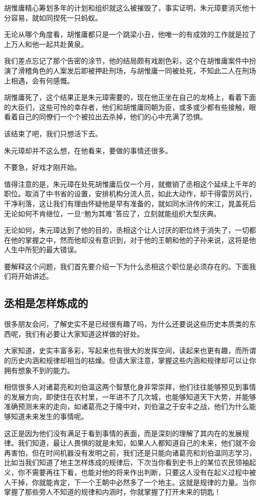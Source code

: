 \begin{multicols}{\theparacolNo}
		胡惟庸精心筹划多年的计划和组织就这么被摧毁了，事实证明，朱元璋要消灭他十分容易，就如同捏死一只蚂蚁。

		无论从哪个角度看，胡惟庸都只是一个跳梁小丑，他唯一的有成效的工作就是拉了上万人和他一起共赴黄泉。

		我们差点忘记了那个告密的涂节，他的结局颇有戏剧色彩，这个在胡惟庸案件中扮演了滑稽角色的人案发后即被押赴刑场，与胡惟庸一同被处死，不知此二人在刑场上相遇，会有何感慨。

		胡惟庸死了，这个结果正是朱元璋需要的，现在他正坐在自己的龙椅上，看着下面的大臣们，这些可怜的幸存者，他们和胡惟庸同朝为臣，或多或少都有些接触，眼看着自己的同僚们一个个被拉出去杀掉，他们的心中充满了恐惧。

		该结束了吧，我们只想活下去。

		朱元璋却并不这么想，在他看来，要做的事情还很多。

		不要急，好戏才刚开始。

		值得注意的是，朱元璋在处死胡惟庸后仅一个月，就撤销了丞相这个延续上千年的职位。取消了中书省的设置，安排机构分流人员，如此大动作，却干得雷厉风行，干净利落，这让我们有理由怀疑他是早有准备的，就如同水浒传的宋江，晁盖死后无论如何不肯继位，一旦“勉为其难”答应了，立刻就能组织大型庆典。

		无论如何，朱元璋达到了他的目的，丞相这个让人讨厌的职位终于消失了，一切都在他的掌握之中，然而他却没有意识到，对于他的王朝和他的子孙来说，这将是他人生中所犯的最大错误。

		要解释这个问题，我们首先要介绍一下为什么丞相这个职位是必须存在的。下面我们将开始讲述。

		\subsection{丞相是怎样炼成的}
		很多朋友会问，了解史实不是已经很有趣了吗，为什么还要说这些历史本质类的东西呢，我们有必要让大家知道这样做的好处。

		大家知道，史实丰富多彩，写起来也有很大的发挥空间，读起来也更有趣，而所谓的历史内涵和规律却相当的枯燥。但请大家注意，掌握这些内涵和规律却可以让你拥有想象不到的能力。

		相信很多人对诸葛亮和刘伯温这两个智慧化身非常崇拜，他们往往能够预见到事情的发展方向，即使住在农村里，一年进不了几次城，也能够知道天下大势，并能够准确预测未来的走向，如诸葛亮之于隆中对，刘伯温之于安丰之战，他们为什么能够知道未来发生的事情呢。

		这正是因为他们没有满足于看到事情的表面，而是深刻的理解了其内在的发展规律。我们知道，最让人畏惧的就是未知，如果人人都知道自己的未来，他们就不会再害怕，但在时间机器没有发明之前，我们还是只能向诸葛亮和刘伯温同志学习，比如当我们知道了地主怎样炼成的规律后，下次当你看到史书上的某位农民领袖起义，你不需要再往下看，也能对他的将来作出判断，只要这人没有在起义过程中被人干掉，你就能肯定，下一个王朝中必然多了一个地主。这就是规律的力量。当你掌握了那些旁人不知道的规律和内涵时，你就掌握了打开未来的钥匙！


\end{multicols}
